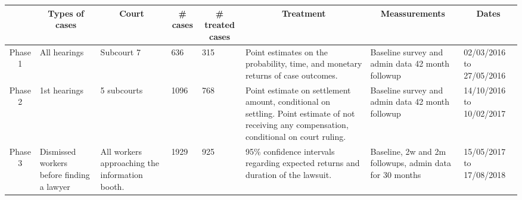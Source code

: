 \begin{tabular}{cp{9.225em}p{8.82em}p{4.135em}p{4.135em}p{12.91em}p{10.275em}p{3.725em}}
\toprule
      & \multicolumn{1}{c}{Types of cases} & \multicolumn{1}{c}{Court} & \multicolumn{1}{c}{\# cases} & \multicolumn{1}{c}{\# treated cases} & \multicolumn{1}{c}{Treatment} & \multicolumn{1}{c}{Meassurements } & \multicolumn{1}{c}{Dates} \\
\midrule
Phase 1 & All hearings\newline{} & Subcourt 7\newline{} & 636\newline{} & 315\newline{} & Point estimates on the probability, time, and monetary returns of case outcomes.\newline{} & Baseline survey and admin data 42 month followup\newline{} & 02/03/2016\newline{} to \newline{}27/05/2016 \\
Phase 2 & 1st hearings\newline{} & 5 subcourts\newline{} & 1096\newline{} & 768\newline{} & Point estimate on settlement amount, conditional on  settling. Point estimate of not receiving any compensation, conditional on court ruling.\newline{} & Baseline survey and admin data 42 month followup\newline{} & 14/10/2016\newline{} to \newline{}10/02/2017 \\
Phase 3 & Dismissed workers \newline{}before finding a lawyer\newline{} & All workers approaching the information booth.\newline{} & 1929\newline{} & 925\newline{} & 95\% confidence intervals regarding expected returns and duration of the lawsuit. \newline{} & Baseline, 2w and 2m followups, admin data for 30 months\newline{} & 15/05/2017\newline{} to \newline{}17/08/2018 \\
\bottomrule
\bottomrule
\end{tabular}%
